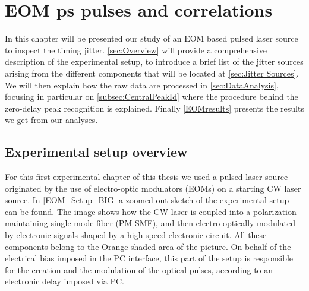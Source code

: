 \chapter{EOM ps pulses and correlations}
\label{Capitolo3}
In this chapter will be presented our study of an EOM based pulsed laser source to inspect the timing jitter.
\autoref{sec:Overview} will provide a comprehensive description of the experimental setup, to introduce a brief list of the jitter sources arising from the different components that will be located at \autoref{sec:Jitter Sources}.
We will then explain how the raw data are processed in \autoref{sec:DataAnalysis}, focusing in particular on \autoref{subsec:CentralPeakId} where the procedure behind the zero-delay peak recognition is explained.
Finally \autoref{EOMresults} presents the results we get from our analyses.


\section{Experimental setup overview}
\label{sec:Overview}

For this first experimental chapter of this thesis we used a pulsed laser source originated by the use of electro-optic modulators (EOMs) on a starting CW laser source.
In \autoref{EOM_Setup_BIG} a zoomed out sketch of the experimental setup can be found. The image shows how the CW laser is coupled into a polarization-maintaining single-mode fiber (PM-SMF), and then electro-optically modulated by electronic signals shaped by a high-speed electronic circuit. All these components belong to the Orange shaded area of the picture.
On behalf of the electrical bias imposed in the PC interface, this part of the setup is responsible for the creation and the modulation of the optical pulses, according to an electronic delay imposed via PC.

